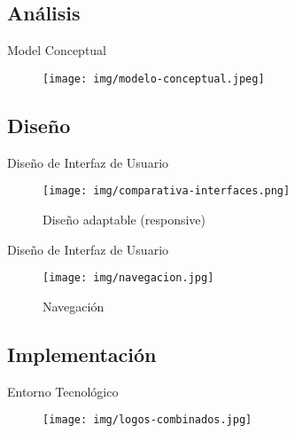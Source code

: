 \documentclass[spanish,xcolor=table,svgnames]{beamer}
\begin{document}
\subsection*{Análisis}
\begin{frame}{Model Conceptual}
  \begin{figure}[H]
    \begin{center}
        \texttt{[image: img/modelo-conceptual.jpeg]}
    \end{center}
    \label{fig:conceptual}
\end{figure}
\end{frame}


\subsection*{Diseño}
\begin{frame}{Diseño de Interfaz de Usuario}
  \begin{figure}[H]
    \begin{center}
        \texttt{[image: img/comparativa-interfaces.png]}
    \end{center}
      \caption{Diseño adaptable (responsive)}
    \label{fig:responsive}
\end{figure}
\end{frame}

\begin{frame}{Diseño de Interfaz de Usuario}
  \begin{figure}[H]
    \begin{center}
      \texttt{[image: img/navegacion.jpg]}
    \end{center}
      \caption{Navegación}
    \label{fig:navegacion}
\end{figure}
\end{frame}





\subsection*{Implementación}

\begin{frame}{Entorno Tecnológico}
  \begin{figure}[H]
    \begin{center}
        \texttt{[image: img/logos-combinados.jpg]}
    \end{center}
    \label{fig:tecnologias}
  \end{figure}
\end{frame}
\end{document}

